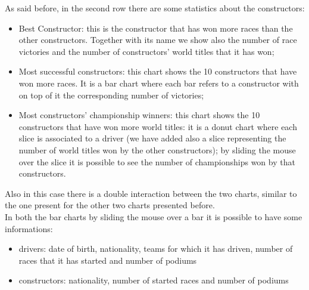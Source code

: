 \documentclass[10pt,twocolumn,letterpaper]{article}
\begin{document}
As said before, in the second row there are some statistics about the constructors:
\begin{itemize}
	\item Best Constructor: this is the constructor that has won more races than the other constructors. Together with its name we show also the number of race victories and
	the number of constructors' world titles that it has won;
	\item Most successful constructors: this chart shows the 10 constructors that have won more races. It is a bar chart where each bar refers to a constructor with on top of
	it the corresponding number of victories;
	\item Most constructors' championship winners: this chart shows the 10 constructors that have won more world titles: it is a donut chart where each slice is associated to
	a driver (we have added also a slice representing the number of world titles won by the other constructors); by sliding the mouse over the slice it is possible to see the
	number of championships won by that constructors.
\end{itemize}
Also in this case there is a double interaction between the two charts, similar to the one present for the other two charts presented before.\\
In both the bar charts by sliding the mouse over a bar it is possible to have some informations:
\begin{itemize}
	\item drivers: date of birth, nationality, teams for which it has driven, number of races that it has started and number of podiums
	\item constructors: nationality, number of started races and number of podiums
\end{itemize}
\end{document}
